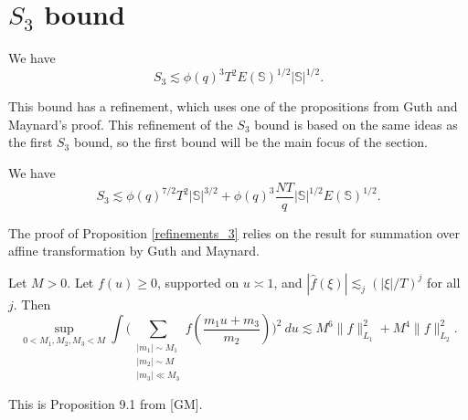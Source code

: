 
\section{$S_3$ bound}
\begin{proposition}
    We have \[
    S_3 \lesssim \phi(q)^3 T^2 E(\mathbb{S})^{1/2} |\mathbb{S}|^{1/2}.
    \]
\end{proposition}
This bound has a refinement, which uses one of the propositions from Guth and Maynard's proof. This refinement of the $S_3$ bound is based on the same ideas as the first $S_3$ bound, so the first bound will be the main focus of the section.
\begin{proposition}[Refinement of $S_3$]
    \label{refinements_3}
    We have \[
    S_3\lesssim \phi(q)^{7/2}T^2|\mathbb{S}|^{3/2}+\phi(q)^{3}\frac{NT}{q}|\mathbb{S}|^{1/2}E(\mathbb{S})^{1/2}.
     \]
\end{proposition}
The proof of Proposition \ref{refinements_3} relies on the result for summation over affine transformation by Guth and Maynard.
\begin{lemma}
    Let $M>0$. Let $f(u)\geq 0$, supported on $u\asymp 1$, and $|\hat{f}(\xi)|\lesssim_j (|\xi|/T)^j$ for all $j$. Then \[
        \sup_{0<M_1,M_2,M_3<M} \int\Bigg( \sum_{\substack{|m_1|\sim M_1\\|m_2|\sim M \\ |m_3|\ll M_3}} f\left(\frac{m_1 u+m_3}{m_2}\right)\Bigg)^2 \ du \lesssim M^6 \|f\|_{L_1}^2+M^4\|f\|_{L_2}^2.
    \] 
\end{lemma}
This is Proposition 9.1 from [GM].


